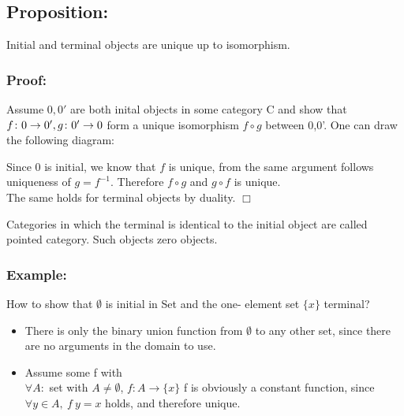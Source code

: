 \subsection {Proposition:}
Initial and terminal objects are unique up to isomorphism.

\subsubsection {Proof:}
Assume $0, 0'$ are both inital objects in some category C and show that
$f \from 0 \to 0', g \from 0' \to 0$ form a unique isomorphism
$f \circ g$ between 0,0'. One can draw the following diagram:



Since $0$ is initial, we know that $f$ is unique, from the same argument follows uniqueness of $g = f^{-1}$. Therefore $f \circ g$ and $g \circ f$ is unique.    
\\ The same holds for terminal objects by duality. $\Box$

Categories in which the terminal is identical to the initial object are called pointed category. Such objects zero objects.

\subsubsection {Example:}
How to show that $\emptyset$ is initial in Set and the one- element set $\{x\}$ terminal?

\begin {itemize}
\item There is only the binary union function from $\emptyset$ to any other set, since there are no arguments in the domain to use.
\item Assume some f with
  \\ $\forall A:$ set with $A \neq \emptyset$, $ f: A \to \{x\}$
  f is obviously a constant function, since $\forall y \in A,\ f \ y = x$ holds, and therefore unique.
\end{itemize}


